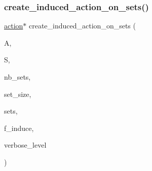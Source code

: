 \mbox{\label{action__global_8_c_a401fff2aa8db09db7cd621cfbf397dd4}} 
\subsubsection{\texorpdfstring{create\+\_\+induced\+\_\+action\+\_\+on\+\_\+sets()}{create\_induced\_action\_on\_sets()}}
{\footnotesize\ttfamily \mbox{\hyperlink{classaction}{action}}$\ast$ create\+\_\+induced\+\_\+action\+\_\+on\+\_\+sets (\begin{DoxyParamCaption}\item[{\mbox{\hyperlink{classaction}{action}} $\ast$}]{A,  }\item[{\mbox{\hyperlink{classsims}{sims}} $\ast$}]{S,  }\item[{\mbox{\hyperlink{galois_8h_a09fddde158a3a20bd2dcadb609de11dc}{I\+NT}}}]{nb\+\_\+sets,  }\item[{\mbox{\hyperlink{galois_8h_a09fddde158a3a20bd2dcadb609de11dc}{I\+NT}}}]{set\+\_\+size,  }\item[{\mbox{\hyperlink{galois_8h_a09fddde158a3a20bd2dcadb609de11dc}{I\+NT}} $\ast$}]{sets,  }\item[{\mbox{\hyperlink{galois_8h_a09fddde158a3a20bd2dcadb609de11dc}{I\+NT}}}]{f\+\_\+induce,  }\item[{\mbox{\hyperlink{galois_8h_a09fddde158a3a20bd2dcadb609de11dc}{I\+NT}}}]{verbose\+\_\+level }\end{DoxyParamCaption})}

\mbox{\label{action__global_8_c_a0f8feabe739b53848853347a45964c25}} 
